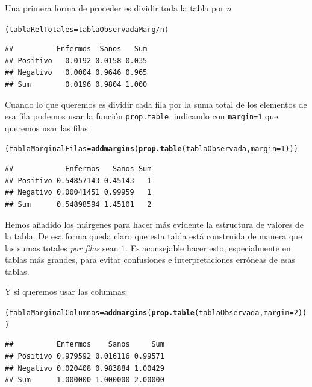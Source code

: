 \documentclass[10pt,a4paper]{article}\usepackage[]{graphicx}\usepackage[]{color}
\makeatletter
\newcommand{\hlnum}[1]{\textcolor[rgb]{0.686,0.059,0.569}{#1}}%
\newcommand{\hlopt}[1]{\textcolor[rgb]{0,0,0}{#1}}%
\newcommand{\hlstd}[1]{\textcolor[rgb]{0.345,0.345,0.345}{#1}}%
\newcommand{\hlkwb}[1]{\textcolor[rgb]{0.69,0.353,0.396}{#1}}%
\newcommand{\hlkwc}[1]{\textcolor[rgb]{0.333,0.667,0.333}{#1}}%
\newcommand{\hlkwd}[1]{\textcolor[rgb]{0.737,0.353,0.396}{\textbf{#1}}}%
\newenvironment{kframe}{%
 \def\at@end@of@kframe{}%
 \ifinner\ifhmode%
  \def\at@end@of@kframe{\end{minipage}}%
  \begin{minipage}{\columnwidth}%
 \fi\fi%
 \def\FrameCommand##1{\hskip\@totalleftmargin \hskip-\fboxsep
 \colorbox{shadecolor}{##1}\hskip-\fboxsep
     \hskip-\linewidth \hskip-\@totalleftmargin \hskip\columnwidth}%
 \MakeFramed {\advance\hsize-\width
   \@totalleftmargin\z@ \linewidth\hsize
   \@setminipage}}%
 {\par\unskip\endMakeFramed%
 \at@end@of@kframe}
\newenvironment{knitrout}{}{} %
\makeatother
\begin{document}
Una primera forma de proceder es dividir toda la tabla por $n$
\begin{knitrout}
\color{fgcolor}\begin{kframe}
\begin{alltt}
\hlstd{(tablaRelTotales} \hlkwb{=} \hlstd{tablaObservadaMarg} \hlopt{/} \hlstd{n)}
\end{alltt}
\begin{verbatim}
##          Enfermos  Sanos   Sum
## Positivo   0.0192 0.0158 0.035
## Negativo   0.0004 0.9646 0.965
## Sum        0.0196 0.9804 1.000
\end{verbatim}
\end{kframe}
\end{knitrout}

Cuando lo que queremos es dividir cada fila por la suma total de los elementos de esa fila podemos usar la función {\tt prop.table}, indicando con {\tt margin=1} que queremos usar las filas:
\begin{knitrout}
\color{fgcolor}\begin{kframe}
\begin{alltt}
\hlstd{(tablaMarginalFilas} \hlkwb{=} \hlkwd{addmargins}\hlstd{(}\hlkwd{prop.table}\hlstd{(tablaObservada,} \hlkwc{margin} \hlstd{=} \hlnum{1}\hlstd{)))}
\end{alltt}
\begin{verbatim}
##            Enfermos   Sanos Sum
## Positivo 0.54857143 0.45143   1
## Negativo 0.00041451 0.99959   1
## Sum      0.54898594 1.45101   2
\end{verbatim}
\end{kframe}
\end{knitrout}
Hemos añadido los márgenes para hacer más evidente la estructura de valores de la tabla. De esa forma queda claro que esta tabla está construida de manera que las sumas totales {\em por filas} sean $1$. Es aconsejable hacer esto, especialmente en tablas más grandes, para evitar confusiones e interpretaciones erróneas de esas tablas.

Y si queremos usar las columnas:
\begin{knitrout}
\color{fgcolor}\begin{kframe}
\begin{alltt}
\hlstd{(tablaMarginalColumnas} \hlkwb{=} \hlkwd{addmargins}\hlstd{(}\hlkwd{prop.table}\hlstd{(tablaObservada,} \hlkwc{margin} \hlstd{=} \hlnum{2}\hlstd{)))}
\end{alltt}
\begin{verbatim}
##          Enfermos    Sanos     Sum
## Positivo 0.979592 0.016116 0.99571
## Negativo 0.020408 0.983884 1.00429
## Sum      1.000000 1.000000 2.00000
\end{verbatim}
\end{kframe}
\end{knitrout}
\end{document}
